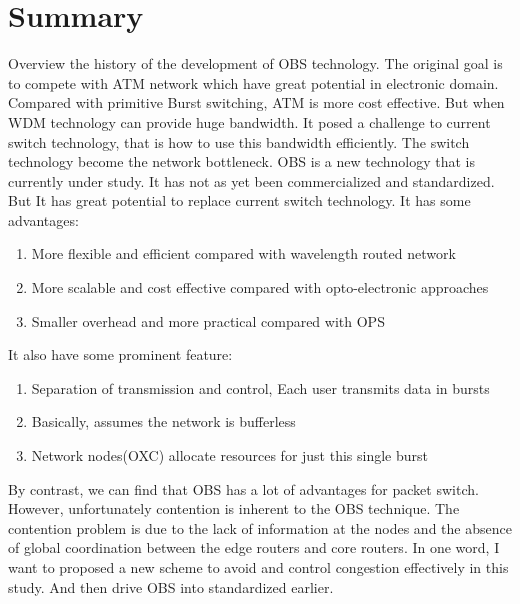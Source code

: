 \section{Summary}

Overview the history of the development of OBS technology. The original goal is to compete with ATM network which have great potential in electronic domain. Compared with primitive Burst switching, ATM is more cost effective. But when WDM technology can provide huge bandwidth. It posed a challenge to current switch technology, that is how to use this bandwidth efficiently. The switch technology become the network bottleneck. OBS is a new technology that is currently
under study. It has not as yet been commercialized and standardized. But It has great potential to replace current switch technology. It has some advantages:

\begin{enumerate}
    \item More flexible and efficient compared with wavelength routed network
    \item More scalable and cost effective compared with opto-electronic approaches
    \item Smaller overhead and more practical compared with OPS
\end{enumerate}

It also have some prominent feature:

\begin{enumerate}

    \item Separation of transmission and control, Each user transmits data in bursts
    \item Basically, assumes the network is bufferless
    \item Network nodes(OXC) allocate resources for just this single burst

\end{enumerate}

By contrast, we can find that OBS has a lot of advantages for packet switch. However, unfortunately contention is inherent to the OBS technique. The contention problem is due to the lack of information at the nodes and the absence of global coordination between the edge routers and core routers. In one word, I want to proposed a new scheme to avoid and control congestion effectively in this study. And then drive OBS into standardized earlier.

